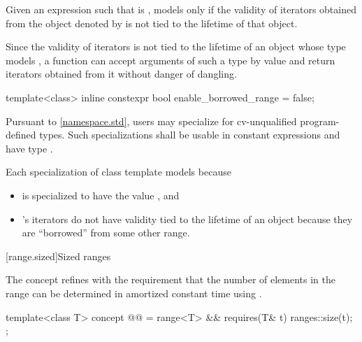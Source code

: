 \begin{itemdescr}
\pnum
Given an expression  such that  is ,
 models  only if
the validity of iterators obtained from the object denoted by 
is not tied to the lifetime of that object.

\pnum
\begin{note}
Since the validity of iterators is not tied to the lifetime of
an object whose type models ,
a function can accept arguments of such a type by value and
return iterators obtained from it without danger of dangling.
\end{note}
\end{itemdescr}

%
\begin{itemdecl}
template<class>
  inline constexpr bool enable_borrowed_range = false;
\end{itemdecl}

\begin{itemdescr}
\pnum
\remarks
Pursuant to \ref{namespace.std}, users may specialize 
for cv-unqualified program-defined types.
Such specializations shall be
usable in constant expressions and
have type .

\pnum
\begin{example}
Each specialization  of class template 
models  because
\begin{itemize}
\item
{} is specialized
to have the value , and

\item
{}'s iterators
do not have validity tied to the lifetime of an  object
because they are ``borrowed'' from some other range.
\end{itemize}
\end{example}
\end{itemdescr}

[range.sized]{Sized ranges}

\pnum
The  concept refines  with
the requirement that the number of elements in the range can be determined
in amortized constant time using .

\begin{itemdecl}
template<class T>
  concept @@ =
    range<T> &&
    requires(T& t) { ranges::size(t); };
\end{itemdecl}

